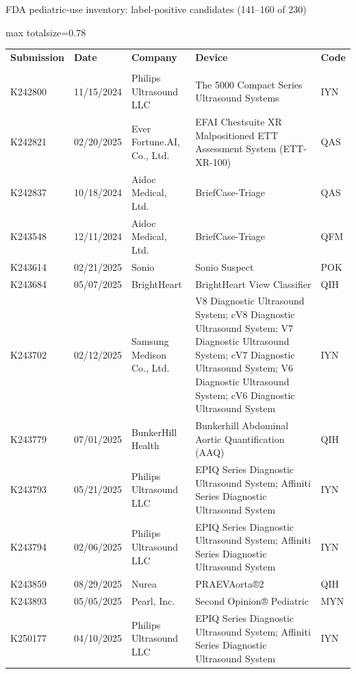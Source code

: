 \documentclass[aspectratio=169]{beamer}
\renewcommand{\arraystretch}{1.08}
\begin{document}
\begin{frame}[category=FDA appendix]{FDA pediatric-use inventory: label-positive candidates (141--160 of 230)}
\begin{adjustbox}{max totalsize={\textwidth}{0.78\textheight}}
\renewcommand{\arraystretch}{1.2}
\begin{tabular}{|p{}|p{}|p{}|p{}|p{}|}
\hline \textbf{Submission} & \textbf{Date} & \textbf{Company} & \textbf{Device} & \textbf{Code} \\\\ \hline
K242800 & 11/15/2024 & Philips Ultrasound LLC & The 5000 Compact Series Ultrasound Systems & IYN \\ \hline
K242821 & 02/20/2025 & Ever Fortune.AI, Co., Ltd. & EFAI Chestsuite XR Malpositioned ETT Assessment System (ETT-XR-100) & QAS \\ \hline
K242837 & 10/18/2024 & Aidoc Medical, Ltd. & BriefCase-Triage & QAS \\ \hline
K243548 & 12/11/2024 & Aidoc Medical, Ltd. & BriefCase-Triage & QFM \\ \hline
K243614 & 02/21/2025 & Sonio & Sonio Suspect & POK \\ \hline
K243684 & 05/07/2025 & BrightHeart & BrightHeart View Classifier & QIH \\ \hline
K243702 & 02/12/2025 & Samsung Medison Co., Ltd. & V8 Diagnostic Ultrasound System; cV8 Diagnostic Ultrasound System; V7 Diagnostic Ultrasound System; cV7 Diagnostic Ultrasound System; V6 Diagnostic Ultrasound System; cV6 Diagnostic Ultrasound System & IYN \\ \hline
K243779 & 07/01/2025 & BunkerHill Health & Bunkerhill Abdominal Aortic Quantification (AAQ) & QIH \\ \hline
K243793 & 05/21/2025 & Philips Ultrasound LLC & EPIQ Series Diagnostic Ultrasound System; Affiniti Series Diagnostic Ultrasound System & IYN \\ \hline
K243794 & 02/06/2025 & Philips Ultrasound LLC & EPIQ Series Diagnostic Ultrasound System; Affiniti Series Diagnostic Ultrasound System & IYN \\ \hline
K243859 & 08/29/2025 & Nurea & PRAEVAorta®2 & QIH \\ \hline
K243893 & 05/05/2025 & Pearl, Inc. & Second Opinion® Pediatric & MYN \\ \hline
K250177 & 04/10/2025 & Philips Ultrasound LLC & EPIQ Series Diagnostic Ultrasound System; Affiniti Series Diagnostic Ultrasound System & IYN \\ \hline

\end{tabular}
\end{adjustbox}
\end{frame}
\end{document}
